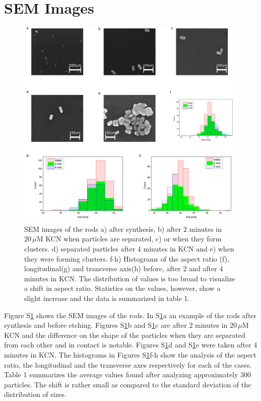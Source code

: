 \documentclass[journal=nalefd,manuscript=letter]{achemso}
\newcommand{\uM}{\ensuremath{\,\mu\textrm{M}}}
\begin{document}
\section{SEM Images}

\begin{figure}[htp]
 \centering
 \includegraphics[width=0.95\linewidth]{Figures/04_Supporting/02_SEM/sem.png}
 \caption{SEM images of the rods a) after synthesis, b) after $2$ minutes in
 $20\uM$ KCN when particles are separated, c) or when they form clusters. d)
 separated particles after $4$ minutes in KCN and e) when they were forming
 clusters. f-h) Histograms of the aspect ratio (f), longitudinal(g) and
 transverse axis(h) before, after $2$ and after $4$ minutes in KCN. The
 distribution of values is too broad to visualize a shift in aspect ratio.
 Statistics on the values, however, show a slight increase and the data is
 summarized in table 1. }
 \label{fig:SEM}
\end{figure}

Figure S\ref{fig:SEM} shows the SEM images of the rods. In S\ref{fig:SEM}a an
example of the rods after synthesis and before etching. Figures S\ref{fig:SEM}b
and S\ref{fig:SEM}c are after $2$ minutes in $20\uM$ KCN and the difference on
the shape of the particles when they are separated from each other and in
contact is notable. Figures S\ref{fig:SEM}d and S\ref{fig:SEM}e were taken after
$4$ minutes in KCN. The histograms in Figures S\ref{fig:SEM}f-h show the
analysis of the aspect ratio, the longitudinal and the transverse axes
respectively for each of the cases. Table 1 summarizes the average values found
after analyzing approximately $300$ particles. The shift is rather small as
compared to the standard deviation of the distribution of sizes.
\end{document}
